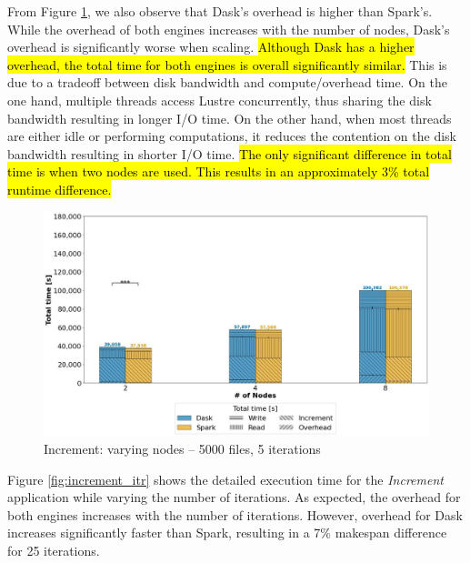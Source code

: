 \documentclass[AMA,STIX1COL]{WileyNJD-v2}
\newcommand{\HL}[1]{\hl{#1}}
\begin{document}
From Figure \ref{fig:increment_worker}, we also observe that Dask's overhead is higher than Spark's.
While the overhead of both engines increases with the number of nodes, Dask's overhead is significantly worse when scaling.
\HL{Although Dask has a higher overhead, the total time for both engines is overall significantly similar.}
This is due to a tradeoff between disk bandwidth and compute/overhead time.
On the one hand, multiple threads access Lustre concurrently, thus sharing the disk bandwidth resulting in longer I/O time.
On the other hand, when most threads are either idle or performing computations, it reduces the contention on the disk bandwidth resulting in shorter I/O time.
\HL{The only significant difference in total time is when two nodes are used.
	This results in an approximately 3\% total runtime difference.}
\begin{figure}[!h]
	\centering
	\includegraphics[clip,width=0.75\columnwidth]{figures/stacked_increment_worker.jpg}
	\caption{Increment: varying nodes -- 5000 files, 5 iterations}
	\label{fig:increment_worker}
\end{figure}
							
Figure \ref{fig:increment_itr} shows the detailed execution time for the \textit{Increment} application while varying the number of iterations.
As expected, the overhead for both engines increases with the number of iterations.
However, overhead for Dask increases significantly faster than Spark, resulting in a 7\% makespan difference for 25 iterations.
							
\end{document}

